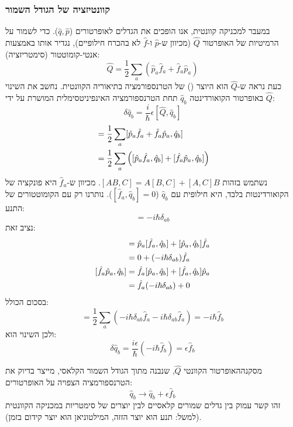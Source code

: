 \subsubsection{קוונטיזציה של הגודל השמור}
במעבר למכניקה קוונטית, אנו הופכים את הגדלים לאופרטורים ($\hat{q}, \hat{p}$). כדי
לשמור על הרמיטיות של האופרטור $\hat{Q}$ (מכיוון ש-$\hat{p}$ ו-$\hat{f}$ לא בהכרח
חילופיים), נגדיר אותו באמצעות אנטי-קומוטטור (סימטריזציה):
\begin{equation}
    \hat{Q}= \frac{1}{2}\sum_{a} \left( \hat{p}_{a} \hat{f}_{a} + \hat{f}_{a} \hat
    {p}_{a} \right)
\end{equation}כעת נראה ש-$\hat{Q}$ הוא היוצר () של הטרנספורמציה בתיאוריה
הקוונטית. נחשב את השינוי באופרטור הקואורדינטה $\hat{q}_{b}$ תחת הטרנספורמציה
האינפיניטסימלית המושרת על ידי $\hat{Q}$:
\begin{equation}
    \delta \hat{q}_{b} = \frac{i}{\hbar}\epsilon [\hat{Q}, \hat{q}_{b}]
\end{equation}
\begin{align}
[\hat{Q}, \hat{q}_b] &= \frac{1}{2} \sum_a [ \hat{p}_a \hat{f}_a +
\hat{f}_a \hat{p}_a , \hat{q}_b ] \notag \\
&= \frac{1}{2} \sum_a \left( [\hat{p}_a \hat{f}_a,
\hat{q}_b] + [\hat{f}_a \hat{p}_a, \hat{q}_b] \right)
\end{align}
נשתמש בזהות $[AB, C] = A[B,C
] + [A,C]B$. מכיוון ש-$\hat{f}_{a}$ היא פונקציה של הקואורדינטות בלבד, היא חילופית
עם $\hat{q}_{b}$ ($[\hat{f}_{a}, \hat{q}_{b}] = 0$). נותרנו רק עם הקומוטטורים של
התנע:
\begin{equation}
[\hat{p}_a, \hat{q}_b] = -i\hbar \delta_{ab}
\end{equation}
נציב זאת:
\begin{align}
[\hat{p}_a \hat{f}_a,
\hat{q}_b] &= \hat{p}_a [\hat{f}_a, \hat{q}_b] + [\hat{p}_a, \hat{q}_b] \hat{f}_a \notag \\
&= 0 + (-i\hbar \delta_{ab}) \hat{f}_a \\
[\hat{f}_{a} \hat{p}_{a}, \hat{q}_{b}] &= \hat{f}_{a} [\hat{p}_{a}, \hat{q}_{b}
    ] + [\hat{f}_{a}, \hat{q}_{b}] \hat{p}_{a} \notag \\
    &= \hat{f}_a (-i\hbar \delta_{ab}) + 0
\end{align}
בסכום הכולל:
\begin{equation}
[\hat{Q}, \hat{q}_b] = \frac{1}{2} \sum_a (-i\hbar \delta_{ab} \hat{f}_a
- i\hbar \delta_{ab} \hat{f}_a) = -i\hbar \hat{f}_b
\end{equation}
ולכן השינוי הוא:
\begin{equation}
    \delta \hat{q}_{b} = \frac{i\epsilon}{\hbar}(-i\hbar \hat{f}_{b}) = \epsilon
    \hat{f}_{b}
\end{equation}
\begin{resultbox}
    {מסקנה}האופרטור הקוונטי $\hat{Q}$, שנבנה מתוך הגודל השמור הקלאסי, מייצר
    בדיוק את הטרנספורמציה הצפויה על האופרטורים:
    \begin{equation}
        \hat{q}_{b} \rightarrow \hat{q}_{b} + \epsilon \hat{f}_{b}
    \end{equation}זהו קשר עמוק בין גדלים שמורים קלאסיים לבין יוצרים של סימטריות
    במכניקה הקוונטית (למשל: תנע הוא יוצר הזזה, המילטוניאן הוא יוצר קידום בזמן).
\end{resultbox}
